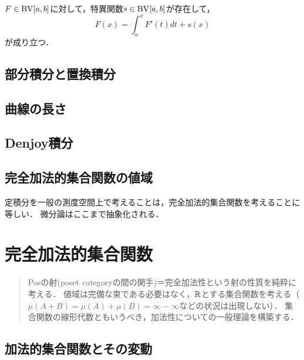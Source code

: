 \documentclass[uplatex, dvipdfmx]{jsreport}
\begin{document}
\begin{example}[Lebesgue (1928)]
    
\end{example}

\begin{corollary}
    $F\in\mathrm{BV}[a,b]$に対して，特異関数$s\in\mathrm{BV}[a,b]$が存在して，
    \[F(x)=\int^x_aF'(t)dt+s(x)\]
    が成り立つ．
\end{corollary}

\section{部分積分と置換積分}

\section{曲線の長さ}

\section{Denjoy積分}

\section{完全加法的集合関数の値域}

\begin{tcolorbox}[colframe=ForestGreen, colback=ForestGreen!10!white,breakable,colbacktitle=ForestGreen!40!white,coltitle=black,fonttitle=\bfseries\sffamily,
title=]
    定積分を一般の測度空間上で考えることは，完全加法的集合関数を考えることに等しい．
    微分論はここまで抽象化される．
\end{tcolorbox}

\chapter{完全加法的集合関数}

\begin{quotation}
    Posの射(poset categoryの間の関手)＝完全加法性という射の性質を純粋に考える．
    値域は完備な束である必要はなく，$\mathbb{R}$とする集合関数を考える（$\mu(A+ B)=\mu(A)+\mu(B)=\infty-\infty$などの状況は出現しない）．
    集合関数の線形代数ともいうべき，加法性についての一般理論を構築する．
\end{quotation}

\section{加法的集合関数とその変動}
\end{document}
